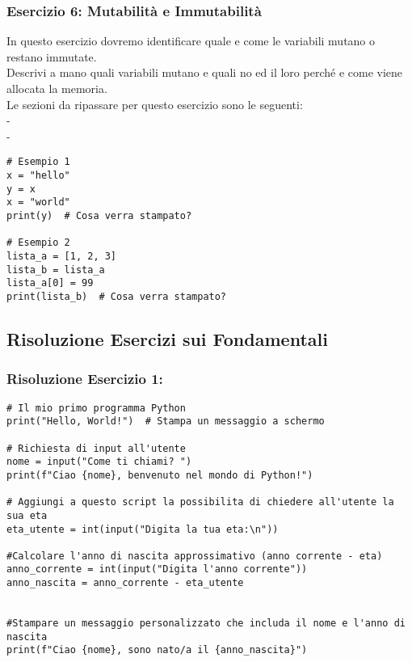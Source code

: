 \subsubsection{Esercizio 6: Mutabilità  e Immutabilità}\label{esercizioFond:6}
In questo esercizio dovremo identificare quale e come le variabili mutano o restano immutate.\\
Descrivi a mano quali variabili mutano e quali no ed il loro perché e come viene allocata la memoria.\\
Le sezioni da ripassare per questo esercizio sono le seguenti:\\
- \\
- 
\vspace{0.3cm}
\begin{lstlisting}
# Esempio 1
x = "hello"
y = x
x = "world"
print(y)  # Cosa verra stampato?

# Esempio 2
lista_a = [1, 2, 3]
lista_b = lista_a
lista_a[0] = 99
print(lista_b)  # Cosa verra stampato?
\end{lstlisting}


\subsection{Risoluzione Esercizi sui Fondamentali}
\subsubsection{Risoluzione Esercizio 1: \textit{}}

\begin{lstlisting}
# Il mio primo programma Python
print("Hello, World!")  # Stampa un messaggio a schermo

# Richiesta di input all'utente
nome = input("Come ti chiami? ")
print(f"Ciao {nome}, benvenuto nel mondo di Python!")

# Aggiungi a questo script la possibilita di chiedere all'utente la sua eta
eta_utente = int(input("Digita la tua eta:\n"))

#Calcolare l'anno di nascita approssimativo (anno corrente - eta)
anno_corrente = int(input("Digita l'anno corrente"))
anno_nascita = anno_corrente - eta_utente


#Stampare un messaggio personalizzato che includa il nome e l'anno di nascita
print(f"Ciao {nome}, sono nato/a il {anno_nascita}")
\end{lstlisting}

\vspace{0.3cm}

